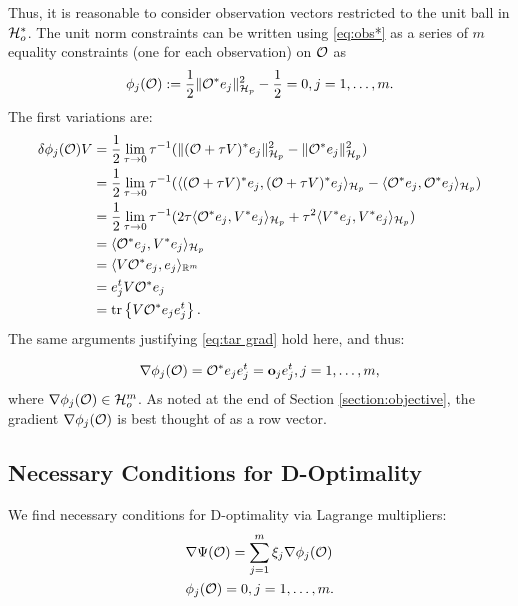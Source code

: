 Thus, it is reasonable to consider observation vectors restricted to
the unit ball in $\mathcal{H}_o^*$. The unit norm constraints can be written
using \eqref{eq:obs*} as a series of $m$ equality constraints (one for
each observation) on $\mathcal{O}$ as
\begin{align}\label{eq:constraints}
  \phi_j(\obs) :=\frac12 \| \obs^* e_j\|_{\hilp}^2 - \frac12 = 0,j=1,\dots,m.
\end{align}
The first variations are:
\begin{align*}
  \delta \phi_j(\obs)V  
  &= \frac12\lim_{\tau \to 0}\tau^{-1}
  ( \|(\obs + \tau V)^*e_j \|_{\hilp}^2 - \|\obs ^*e_j \|_{\hilp}^2  ) \\
  &= \frac12\lim_{\tau \to 0}\tau^{-1}
  ( \langle (\obs + \tau V)^*e_j, (\obs + \tau V)^*e_j \rangle_{\hilp} - 
  \langle \obs^*e_j, \obs^*e_j \rangle_{\hilp} ) \\
  &= \frac12\lim_{\tau \to 0}\tau^{-1}
  (2\tau \langle \obs^*e_j,V^*e_j \rangle_{\hilp} 
  +\tau^2 \langle V^*e_j, V^*e_j \rangle_{\hilp} ) \\
  &= \langle \obs^*e_j,V^*e_j \rangle_{\hilp} \\
  &= \langle V \obs^*e_j,e_j \rangle_{\R^m} \\
  &= e_j^t V \obs^* e_j \\
  &= \tr{V \obs^* e_je_j^t}.
\end{align*}
The same arguments justifying \eqref{eq:tar grad} hold here, and thus:

\begin{align}\label{eq:grad constraints}
\nabla \phi_j(\obs) = \obs^* e_j e_j^t = \meas_j e_j^t , j=1,\dots,m,
\end{align}
where $\nabla \phi_j(\mathcal{O}) \in \mathcal{H}_o^m$. As noted at the end of
Section \ref{section:objective}, the gradient $\nabla \phi_j(\mathcal{O})$ is
best thought of as a row vector.

\subsection{Necessary Conditions for D-Optimality}\label{subsec:necessary}
We find necessary conditions for D-optimality via Lagrange
multipliers:
\begin{align}
  &\nabla \tar(\obs) = \sum_{j=1}^m \xi_j \nabla \phi_j (\obs)
  \label{eq:Lagrange mult1} \\
    &\phi_j(\obs) = 0, j = 1,\dots,m. \label{eq:Lagrange mult2}
\end{align}

